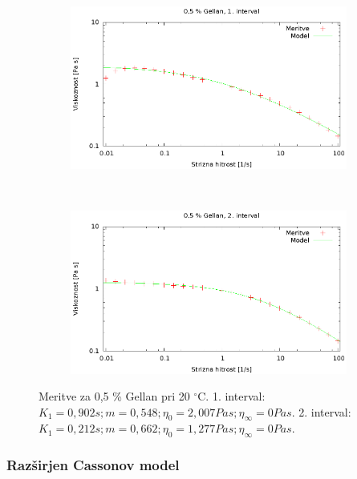\documentclass{article}
\begin{document}
\begin{figure}[H]
	\centering
	\begin{subfigure}[b]{0.45\textwidth}
	       \includegraphics[width=\textwidth]{cross_gel3.eps}
	   \end{subfigure}
	   ~
	   \begin{subfigure}[b]{0.45\textwidth}
	       \includegraphics[width=\textwidth]{cross_gel4.eps}
	   \end{subfigure}
	\caption{Meritve za 0,5 \% Gellan pri 20 $^\circ$C. 1. interval: $K_1 = 0,902 s; m = 0,548; \eta_0 = 2,007 Pa s; \eta_\infty = 0 Pa s$. 2. interval: $K_1 = 0,212 s; m = 0,662; \eta_0 = 1,277 Pa s; \eta_\infty = 0 Pa s$.}
	\label{fig:cross_gel2}
\end{figure}

\subsubsection{Razširjen Cassonov model}
\end{document}
